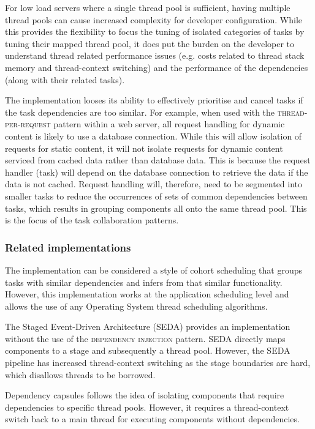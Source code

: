 \documentclass[prodmode]{style/acmlarge}
\begin{document}
For low load servers where a single thread pool is sufficient, having multiple
thread pools can cause increased complexity for developer configuration.  While
this provides the flexibility to focus the tuning of isolated categories of
tasks by tuning their mapped thread pool, it does put the burden on the
developer to understand thread related performance issues (e.g. costs related to
thread stack memory and thread-context switching) and the performance of the
dependencies (along with their related tasks).

The implementation looses its ability to effectively prioritise and cancel tasks
if the task dependencies are too similar.  For example, when used with the
\textsc{thread-per-request} pattern within a web server, all request handling
for dynamic content is likely to use a database connection.  While this will
allow isolation of requests for static content, it will not isolate requests for
dynamic content serviced from cached data rather than database data.  This is
because the request handler (task) will depend on the database connection to
retrieve the data if the data is not cached.  Request handling will, therefore,
need to be segmented into smaller tasks to reduce the occurrences of sets of
common dependencies between tasks, which results in grouping components all onto
the same thread pool.  This is the focus of the task collaboration patterns.


\subsubsection*{Related implementations}

The implementation can be considered a style of cohort scheduling \cite{cohort}
that groups tasks with similar dependencies and infers from that similar
functionality.  However, this implementation works at the application scheduling
level and allows the use of any Operating System thread scheduling algorithms.

The Staged Event-Driven Architecture (SEDA) \cite{seda} provides an
implementation without the use of the \textsc{dependency injection} pattern. 
SEDA directly maps components to a stage and subsequently a thread pool. 
However, the SEDA pipeline has increased thread-context switching as the stage
boundaries are hard, which disallows threads to be borrowed.

Dependency capsules \cite{dependency-capsules} follows the idea of isolating
components that require dependencies to specific thread pools.  However, it
requires a thread-context switch back to a main thread for executing components
without dependencies.
\end{document}
